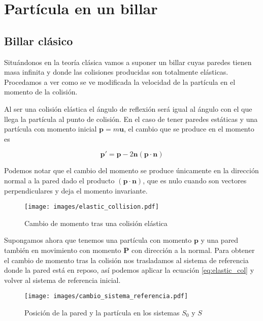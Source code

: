 \documentclass[11pt, spanish]{book}
\begin{document}
\chapter{Partícula en un billar}

\section{Billar clásico}

Situándonos en la teoría clásica vamos a suponer un billar cuyas paredes tienen masa infinita y donde las colisiones producidas son totalmente elásticas. Procedamos a ver como se ve modificada la velocidad de la partícula en el momento de la colisión.

\vspace{3mm}

Al ser una colisión elástica el ángulo de reflexión será igual al ángulo con el que llega la partícula al punto de colisión. En el caso de tener paredes estáticas y una partícula con momento inicial \( \mathbf{p} = m\mathbf{u}\), el cambio que se produce en el momento es 

\begin{equation}\label{eq:elastic_col}
    \mathbf{p}' = \mathbf{p} - 2\mathbf{n}(\mathbf{p} \cdot \mathbf{n})
\end{equation}

Podemos notar que el cambio del momento se produce únicamente en la dirección normal a la pared dado el producto \( (\mathbf{p} \cdot \mathbf{n}) \), que es nulo cuando son vectores perpendiculares y deja el momento invariante.

\begin{figure}[H]
    \centering
    \texttt{[image: images/elastic\_collision.pdf]}
    \caption{Cambio de momento tras una colisión elástica}
    \label{fig:elastic_col}
\end{figure}

\vspace{3mm}

Supongamos ahora que tenemos una partícula con momento \( \mathbf{p} \) y una pared también en movimiento con momento \( \mathbf{P} \) con dirección a la normal. Para obtener el cambio de momento tras la colisión nos trasladamos al sistema de referencia donde la pared está en reposo, así podemos aplicar la ecuación \ref{eq:elastic_col} y volver al sistema de referencia inicial.

\begin{figure}[H]
    \centering
    \texttt{[image: images/cambio\_sistema\_referencia.pdf]}
    \caption{Posición de la pared y la partícula en los sistemas $S_0$ y $S$}
    \label{fig:cambio_referencia}
\end{figure}
\end{document}
